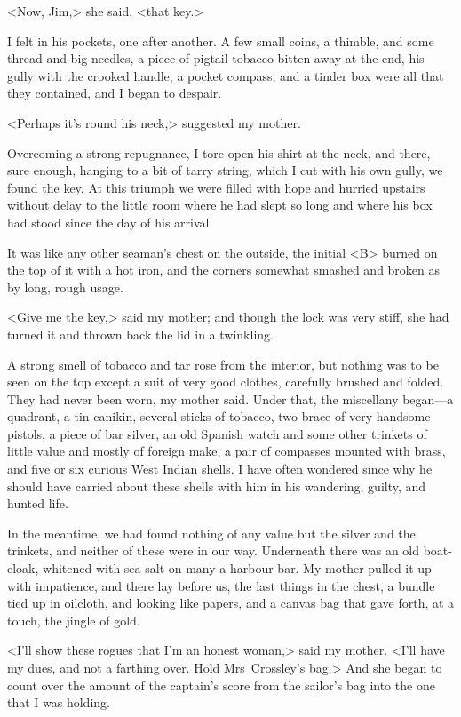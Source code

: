 <Now, Jim,> she said, <that key.>

I felt in his pockets, one after another. A few small coins, a thimble, and some thread and big needles, a piece of pigtail tobacco bitten away at the end, his gully with the crooked handle, a pocket compass, and a tinder box were all that they contained, and I began to despair.

<Perhaps it's round his neck,> suggested my mother.

Overcoming a strong repugnance, I tore open his shirt at the neck, and there, sure enough, hanging to a bit of tarry string, which I cut with his own gully, we found the key. At this triumph we were filled with hope and hurried upstairs without delay to the little room where he had slept so long and where his box had stood since the day of his arrival.

It was like any other seaman's chest on the outside, the initial <B> burned on the top of it with a hot iron, and the corners somewhat smashed and broken as by long, rough usage.

<Give me the key,> said my mother; and though the lock was very stiff, she had turned it and thrown back the lid in a twinkling.

A strong smell of tobacco and tar rose from the interior, but nothing was to be seen on the top except a suit of very good clothes, carefully brushed and folded. They had never been worn, my mother said. Under that, the miscellany began—a quadrant, a tin canikin, several sticks of tobacco, two brace of very handsome pistols, a piece of bar silver, an old Spanish watch and some other trinkets of little value and mostly of foreign make, a pair of compasses mounted with brass, and five or six curious West Indian shells. I have often wondered since why he should have carried about these shells with him in his wandering, guilty, and hunted life.

In the meantime, we had found nothing of any value but the silver and the trinkets, and neither of these were in our way. Underneath there was an old boat-cloak, whitened with sea-salt on many a harbour-bar. My mother pulled it up with impatience, and there lay before us, the last things in the chest, a bundle tied up in oilcloth, and looking like papers, and a canvas bag that gave forth, at a touch, the jingle of gold.

<I'll show these rogues that I'm an honest woman,> said my mother. <I'll have my dues, and not a farthing over. Hold Mrs~Crossley's bag.> And she began to count over the amount of the captain's score from the sailor's bag into the one that I was holding.

